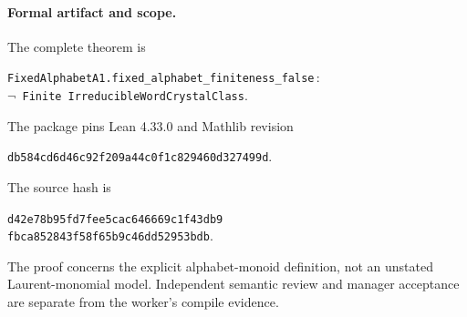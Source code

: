 \documentclass[11pt]{article}
\begin{document}
\paragraph{Formal artifact and scope.}
The complete theorem is
\begin{center}
\texttt{FixedAlphabetA1.fixed\_alphabet\_finiteness\_false}\,:\\
\texttt{$\neg$ Finite IrreducibleWordCrystalClass}.
\end{center}
The package pins Lean 4.33.0 and Mathlib revision
\begin{center}\small
\texttt{db584cd6d46c92f209a44c0f1c829460d327499d}.
\end{center}
The source hash is
\begin{center}\small
\texttt{d42e78b95fd7fee5cac646669c1f43db9}\\
\texttt{fbca852843f58f65b9c46dd52953bdb}.
\end{center}
The proof concerns the explicit alphabet-monoid definition, not an unstated Laurent-monomial model. Independent semantic review and manager acceptance are separate from the worker's compile evidence.
\end{document}
